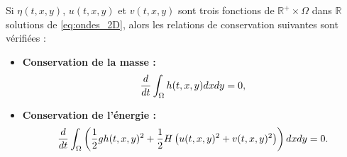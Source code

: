 \begin{proposition}
Si $\eta(t,x,y)$, $u(t,x,y)$ et $v(t,x,y)$ sont trois fonctions de $\mathbb{R}^+ \times \Omega$ dans $\mathbb{R}$ solutions de \eqref{eq:ondes_2D}, alors les relations de conservation suivantes sont vérifiées :
\begin{itemize}
\item \textbf{Conservation de la masse :}
\begin{equation}
\dfrac{d}{dt} \displaystyle\int_{\Omega} h(t,x,y)dxdy = 0,
\end{equation}
\item \textbf{Conservation de l'énergie :}
\begin{equation}
\dfrac{d}{dt} \displaystyle\int_{\Omega} \left( \dfrac{1}{2} g h(t,x,y)^2 + \dfrac{1}{2} H \left( u(t,x,y)^2 + v(t,x,y)^2 \right) \right) dxdy = 0.
\end{equation}
\end{itemize}
\end{proposition}

